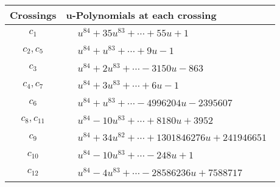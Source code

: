 \documentclass[1p]{elsarticle_modified}
\theoremstyle{definition}
\begin{document}
\begin{tabular}{m{50pt}|m{274pt}}
Crossings & \hspace{64pt}u-Polynomials at each crossing \\
\hline $$\begin{aligned}c_{1}\end{aligned}$$&$\begin{aligned}
&u^{84}+35 u^{83}+\cdots+55 u+1
\end{aligned}$\\
\hline $$\begin{aligned}c_{2},c_{5}\end{aligned}$$&$\begin{aligned}
&u^{84}+u^{83}+\cdots+9 u-1
\end{aligned}$\\
\hline $$\begin{aligned}c_{3}\end{aligned}$$&$\begin{aligned}
&u^{84}+2 u^{83}+\cdots-3150 u-863
\end{aligned}$\\
\hline $$\begin{aligned}c_{4},c_{7}\end{aligned}$$&$\begin{aligned}
&u^{84}+3 u^{83}+\cdots+6 u-1
\end{aligned}$\\
\hline $$\begin{aligned}c_{6}\end{aligned}$$&$\begin{aligned}
&u^{84}+u^{83}+\cdots-4996204 u-2395607
\end{aligned}$\\
\hline $$\begin{aligned}c_{8},c_{11}\end{aligned}$$&$\begin{aligned}
&u^{84}-10 u^{83}+\cdots+8180 u+3952
\end{aligned}$\\
\hline $$\begin{aligned}c_{9}\end{aligned}$$&$\begin{aligned}
&u^{84}+34 u^{82}+\cdots+1301846276 u+241946651
\end{aligned}$\\
\hline $$\begin{aligned}c_{10}\end{aligned}$$&$\begin{aligned}
&u^{84}-10 u^{83}+\cdots-248 u+1
\end{aligned}$\\
\hline $$\begin{aligned}c_{12}\end{aligned}$$&$\begin{aligned}
&u^{84}-4 u^{83}+\cdots-28586236 u+7588717
\end{aligned}$\\
\hline
\end{tabular}\\~\\
\end{document}
